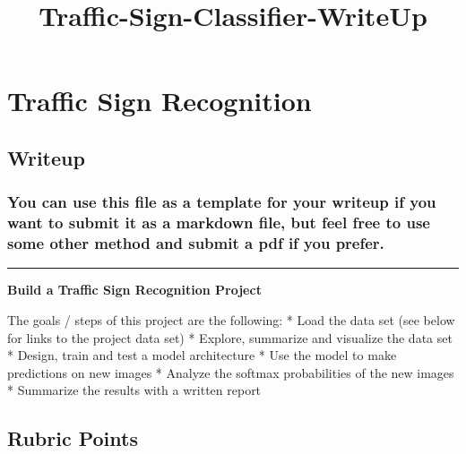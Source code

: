 \documentclass[11pt]{article}
\title{Traffic-Sign-Classifier-WriteUp}
\begin{document}
    
    
    \maketitle
    
    

    
    \hypertarget{traffic-sign-recognition}{%
\section{\texorpdfstring{\textbf{Traffic Sign
Recognition}}{Traffic Sign Recognition}}\label{traffic-sign-recognition}}

\hypertarget{writeup}{%
\subsection{Writeup}\label{writeup}}

\hypertarget{you-can-use-this-file-as-a-template-for-your-writeup-if-you-want-to-submit-it-as-a-markdown-file-but-feel-free-to-use-some-other-method-and-submit-a-pdf-if-you-prefer.}{%
\subsubsection{You can use this file as a template for your writeup if
you want to submit it as a markdown file, but feel free to use some
other method and submit a pdf if you
prefer.}\label{you-can-use-this-file-as-a-template-for-your-writeup-if-you-want-to-submit-it-as-a-markdown-file-but-feel-free-to-use-some-other-method-and-submit-a-pdf-if-you-prefer.}}

\begin{center}\rule{0.5\linewidth}{\linethickness}\end{center}

\textbf{Build a Traffic Sign Recognition Project}

The goals / steps of this project are the following: * Load the data set
(see below for links to the project data set) * Explore, summarize and
visualize the data set * Design, train and test a model architecture *
Use the model to make predictions on new images * Analyze the softmax
probabilities of the new images * Summarize the results with a written
report

\hypertarget{rubric-points}{%
\subsection{Rubric Points}\label{rubric-points}}
\end{document}
